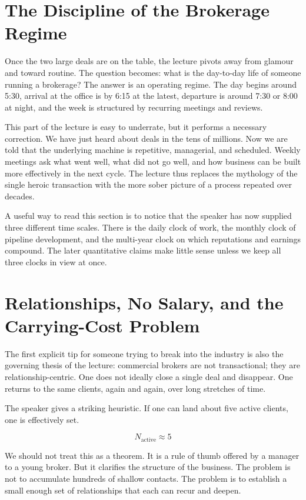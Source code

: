 \section{The Discipline of the Brokerage Regime}

Once the two large deals are on the table, the lecture pivots away from glamour and toward routine. The question becomes: what is the day-to-day life of someone running a brokerage? The answer is an operating regime. The day begins around 5:30, arrival at the office is by 6:15 at the latest, departure is around 7:30 or 8:00 at night, and the week is structured by recurring meetings and reviews.

This part of the lecture is easy to underrate, but it performs a necessary correction. We have just heard about deals in the tens of millions. Now we are told that the underlying machine is repetitive, managerial, and scheduled. Weekly meetings ask what went well, what did not go well, and how business can be built more effectively in the next cycle. The lecture thus replaces the mythology of the single heroic transaction with the more sober picture of a process repeated over decades.

A useful way to read this section is to notice that the speaker has now supplied three different time scales. There is the daily clock of work, the monthly clock of pipeline development, and the multi-year clock on which reputations and earnings compound. The later quantitative claims make little sense unless we keep all three clocks in view at once.

\section{Relationships, No Salary, and the Carrying-Cost Problem}

The first explicit tip for someone trying to break into the industry is also the governing thesis of the lecture: commercial brokers are not transactional; they are relationship-centric. One does not ideally close a single deal and disappear. One returns to the same clients, again and again, over long stretches of time.

The speaker gives a striking heuristic. If one can land about five active clients, one is effectively set.

\begin{equation}
N_{\text{active}} \approx 5
\end{equation}

We should not treat this as a theorem. It is a rule of thumb offered by a manager to a young broker. But it clarifies the structure of the business. The problem is not to accumulate hundreds of shallow contacts. The problem is to establish a small enough set of relationships that each can recur and deepen.

